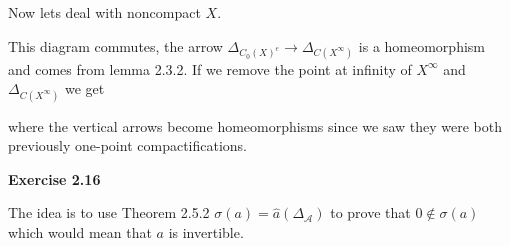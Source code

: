 \documentclass{article}
\begin{document}
\vspace{0.2cm}

Now lets deal with noncompact $X$.

\vspace{0.1cm}

\begin{center}
\end{center}

\vspace{0.2cm}

This diagram commutes, the arrow $\Delta_{C_0(X)^e} \rightarrow \Delta_{C(X^\infty)}$ is a homeomorphism and comes from lemma 2.3.2. If we remove the point at infinity of $X^\infty$ and $\Delta_{C(X^{\infty})}$ we get 

\begin{center}
\end{center}

where the vertical arrows become homeomorphisms since we saw they were both previously one-point compactifications.

\vspace{0.5cm}

\textbf{Exercise 2.16}

\vspace{0.5cm}

The idea is to use Theorem 2.5.2 $\sigma(a) = \hat a(\Delta_\mathcal A)$ to prove that $0 \not \in \sigma(a)$ which would mean that $a$ is invertible.
\end{document}
